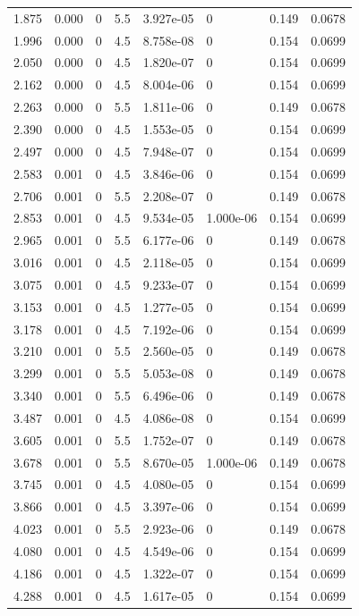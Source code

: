 \documentclass[preview]{standalone}
\begin{document}
{{\begin{tabular}{L{1.2cm}C{1.2cm} C{0.3cm}C{0.5cm} C{1.4cm}C{1.4cm} C{1.4cm}C{1.4cm}}
  1.875  &  0.000  & 0     & 5.5 &  3.927e-05  & 0  & 0.149 &  0.0678   \\ 
  1.996  &  0.000  & 0     & 4.5 &  8.758e-08  & 0  & 0.154 &  0.0699   \\ 
  2.050  &  0.000  & 0     & 4.5 &  1.820e-07  & 0  & 0.154 &  0.0699   \\ 
  2.162  &  0.000  & 0     & 4.5 &  8.004e-06  & 0  & 0.154 &  0.0699   \\ 
  2.263  &  0.000  & 0     & 5.5 &  1.811e-06  & 0  & 0.149 &  0.0678   \\ 
  2.390  &  0.000  & 0     & 4.5 &  1.553e-05  & 0  & 0.154 &  0.0699   \\ 
  2.497  &  0.000  & 0     & 4.5 &  7.948e-07  & 0  & 0.154 &  0.0699   \\ 
  2.583  &  0.001  & 0     & 4.5 &  3.846e-06  & 0  & 0.154 &  0.0699   \\ 
  2.706  &  0.001  & 0     & 5.5 &  2.208e-07  & 0  & 0.149 &  0.0678   \\ 
  2.853  &  0.001  & 0     & 4.5 &  9.534e-05  & 1.000e-06  & 0.154 &  0.0699   \\ 
  2.965  &  0.001  & 0     & 5.5 &  6.177e-06  & 0  & 0.149 &  0.0678   \\ 
  3.016  &  0.001  & 0     & 4.5 &  2.118e-05  & 0  & 0.154 &  0.0699   \\ 
  3.075  &  0.001  & 0     & 4.5 &  9.233e-07  & 0  & 0.154 &  0.0699   \\ 
  3.153  &  0.001  & 0     & 4.5 &  1.277e-05  & 0  & 0.154 &  0.0699   \\ 
  3.178  &  0.001  & 0     & 4.5 &  7.192e-06  & 0  & 0.154 &  0.0699   \\ 
  3.210  &  0.001  & 0     & 5.5 &  2.560e-05  & 0  & 0.149 &  0.0678   \\ 
  3.299  &  0.001  & 0     & 5.5 &  5.053e-08  & 0  & 0.149 &  0.0678   \\ 
  3.340  &  0.001  & 0     & 5.5 &  6.496e-06  & 0  & 0.149 &  0.0678   \\ 
  3.487  &  0.001  & 0     & 4.5 &  4.086e-08  & 0  & 0.154 &  0.0699   \\ 
  3.605  &  0.001  & 0     & 5.5 &  1.752e-07  & 0  & 0.149 &  0.0678   \\ 
  3.678  &  0.001  & 0     & 5.5 &  8.670e-05  & 1.000e-06  & 0.149 &  0.0678   \\ 
  3.745  &  0.001  & 0     & 4.5 &  4.080e-05  & 0  & 0.154 &  0.0699   \\ 
  3.866  &  0.001  & 0     & 4.5 &  3.397e-06  & 0  & 0.154 &  0.0699   \\ 
  4.023  &  0.001  & 0     & 5.5 &  2.923e-06  & 0  & 0.149 &  0.0678   \\ 
  4.080  &  0.001  & 0     & 4.5 &  4.549e-06  & 0  & 0.154 &  0.0699   \\ 
  4.186  &  0.001  & 0     & 4.5 &  1.322e-07  & 0  & 0.154 &  0.0699   \\ 
  4.288  &  0.001  & 0     & 4.5 &  1.617e-05  & 0  & 0.154 &  0.0699   \\ 
\hline 
\end{tabular} 

}}
\end{document}
